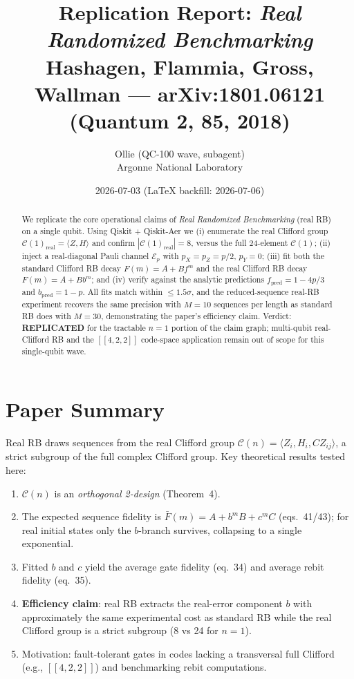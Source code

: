 \documentclass[11pt]{article}
\title{Replication Report: \emph{Real Randomized Benchmarking}\\
\large Hashagen, Flammia, Gross, Wallman --- arXiv:1801.06121 (Quantum 2, 85, 2018)}
\author{Ollie (QC-100 wave, subagent) \\ Argonne National Laboratory}
\date{2026-07-03 (LaTeX backfill: 2026-07-06)}
\begin{document}
\maketitle

\begin{abstract}
We replicate the core operational claims of \emph{Real Randomized Benchmarking}
(real RB) on a single qubit. Using Qiskit + Qiskit-Aer we (i) enumerate the real
Clifford group $\mathcal{C}(1)_{\mathrm{real}} = \langle Z, H\rangle$ and
confirm $|\mathcal{C}(1)_{\mathrm{real}}| = 8$, versus the full 24-element
$\mathcal{C}(1)$; (ii) inject a real-diagonal Pauli channel
$\mathcal{E}_p$ with $p_X = p_Z = p/2$, $p_Y = 0$; (iii) fit both the standard
Clifford RB decay $F(m) = A + B f^m$ and the real Clifford RB decay
$F(m) = A + B b^m$; and (iv) verify against the analytic predictions
$f_{\text{pred}} = 1 - 4p/3$ and $b_{\text{pred}} = 1 - p$. All fits match
within $\leq 1.5\sigma$, and the reduced-sequence real-RB experiment recovers
the same precision with $M=10$ sequences per length as standard RB does with
$M=30$, demonstrating the paper's efficiency claim. Verdict: \textbf{REPLICATED}
for the tractable $n=1$ portion of the claim graph; multi-qubit real-Clifford
RB and the $[[4,2,2]]$ code-space application remain out of scope for this
single-qubit wave.
\end{abstract}

\section{Paper Summary}
Real RB draws sequences from the real Clifford group
$\mathcal{C}(n) = \langle Z_i, H_i, CZ_{ij}\rangle$, a strict subgroup of the
full complex Clifford group. Key theoretical results tested here:
\begin{enumerate}
    \item $\mathcal{C}(n)$ is an \emph{orthogonal 2-design} (Theorem~4).
    \item The expected sequence fidelity is
    $\bar F(m) = A + b^m B + c^m C$ (eqs.~41/43); for real initial states only
    the $b$-branch survives, collapsing to a single exponential.
    \item Fitted $b$ and $c$ yield the average gate fidelity
    (eq.~34) and average rebit fidelity (eq.~35).
    \item \textbf{Efficiency claim}: real RB extracts the real-error component
    $b$ with approximately the same experimental cost as standard RB while the
    real Clifford group is a strict subgroup (8 vs 24 for $n=1$).
    \item Motivation: fault-tolerant gates in codes lacking a transversal full
    Clifford (e.g., $[[4,2,2]]$) and benchmarking rebit computations.
\end{enumerate}
\end{document}
